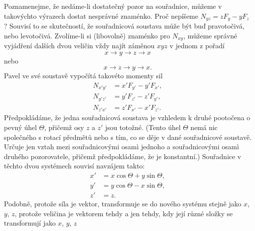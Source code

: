     Poznamenejme, že nedáme-li dostatečný pozor na souřadnice, můžeme v takovýchto výrazech dostat
    nesprávné znaménko. Proč nepíšeme \(N_{yz} = zF_y - yF_z\)? Souvisí to se skutečností, že
    souřadnicová soustava může být buď pravotočivá, nebo levotočivá. Zvolíme-li si (libovolně)
    znaménko pro \(N_{xy}\), můžeme správné vyjádření dalších dvou veličin vždy najít záměnou
    \(xyz\) v jednom z pořadí
    \begin{equation*}
      x \rightarrow y \rightarrow z \rightarrow x
    \end{equation*}
    nebo
    \begin{equation*}
      x \rightarrow z \rightarrow y \rightarrow x.
    \end{equation*}
    Pavel ve své soustavě vypočítá takovéto momenty sil
    \begin{subequations}\label{fyz:eq711}
      \begin{align}
        N_{x'y'} &=  x'F_{y'} - y'F_{x'}, \label{fyz:eq711a}  \\
        N_{y'z'} &=  y'F_{z'} - z'F_{y'}, \label{fyz:eq711b}  \\
        N_{z'x'} &=  z'F_{x'} - x'F_{z'}. \label{fyz:eq711c}        
      \end{align}
    \end{subequations} 
    Předpokládáme, že jedna souřadnicová soustava je vzhledem k druhé pootočena o pevný úhel
    \(\Theta\), přičemž osy \(z\) a \(z'\) jsou totožné. (Tento úhel \(\Theta\) nemá nic společného
    s rotací předmětů nebo s tím, co se děje v dané souřadnicové soustavě. Určuje jen vztah mezi
    souřadnicovými osamì jednoho a souřadnicovými osamì druhého pozorovatele, přičemž předpokládáme,
    že je konstantní.) Souřadnice v těchto dvou systémech souvisí navzájem takto:
    \begin{subequations}\label{fyz:eq712}
      \begin{align}
        x' &=  x\cos\Theta + y\sin\Theta, \label{fyz:eq712a}  \\
        y' &=  y\cos\Theta - x\sin\Theta, \label{fyz:eq712b}  \\
        z' &=  z.                         \label{fyz:eq712c}        
      \end{align}
    \end{subequations} 
    Podobně, protože síla je vektor, transformuje se do nového systému stejně jako \(x\), \(y\),
    \(z\), protože veličina je vektorem tehdy a jen tehdy, kdy její různé složky se transformují
    jako \(x\), \(y\), \(z\)
